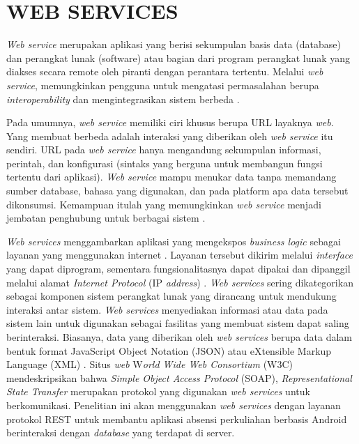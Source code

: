 \section{\uppercase{WEB SERVICES}}
\par \textit{Web service} merupakan aplikasi yang berisi sekumpulan basis data (database) dan perangkat lunak (software) atau bagian dari program perangkat lunak yang diakses secara remote oleh piranti dengan perantara tertentu. Melalui \textit{web service}, memungkinkan pengguna untuk mengatasi permasalahan berupa \textit{interoperability} dan mengintegrasikan sistem berbeda \citep{Chuangwei2011}.

\par Pada umumnya, \textit{web service} memiliki ciri khusus berupa URL layaknya \textit{web}. Yang membuat berbeda adalah interaksi yang diberikan oleh \textit{web service} itu sendiri. URL pada \textit{web service} hanya mengandung sekumpulan informasi, perintah, dan konfigurasi (sintaks yang berguna untuk membangun fungsi tertentu dari aplikasi). \textit{Web service} mampu menukar data tanpa memandang sumber database, bahasa yang digunakan, dan pada platform apa data tersebut dikonsumsi. Kemampuan itulah yang memungkinkan \textit{web service} menjadi jembatan penghubung untuk berbagai sistem \citep{Chuangwei2011}.

\par \textit{Web services} menggambarkan aplikasi yang mengekspos \textit{business logic} sebagai layanan yang menggunakan internet \citep{Mironela2009}. Layanan tersebut dikirim melalui \textit{interface} yang dapat diprogram, sementara fungsionalitasnya dapat dipakai dan dipanggil melalui alamat \textit{Internet Protocol} (IP \textit{address}) \citep{Wagh2012}. \textit{Web services} sering dikategorikan sebagai komponen sistem perangkat lunak yang dirancang untuk mendukung interaksi antar sistem. \textit{Web services} menyediakan informasi atau data pada sistem lain untuk digunakan sebagai fasilitas yang membuat sistem dapat saling berinteraksi. Biasanya, data yang diberikan oleh \textit{web services} berupa data dalam bentuk format JavaScript Object Notation (JSON) atau eXtensible Markup Language (XML) \citep{Rahman2013}. Situs \textit{web} W\textit{orld Wide Web Consortium} (W3C) mendeskripsikan  bahwa \textit{Simple Object Access Protocol} (SOAP), \textit{Representational State Transfer} merupakan protokol yang digunakan \textit{web services} untuk berkomunikasi. Penelitian ini akan menggunakan \textit{web services} dengan layanan protokol REST untuk membantu aplikasi absensi perkuliahan berbasis Android berinteraksi dengan \textit{database} yang terdapat di server.

